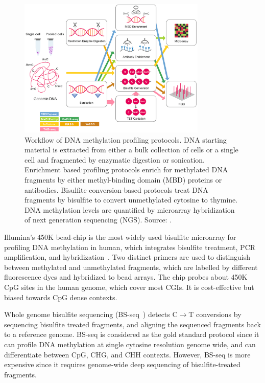 \begin{figure}[htbp!]
\centering
\includegraphics[width=0.8\textwidth]{seq}
\caption[Workflow of DNA methylation profiling protocols.]{Workflow of DNA methylation profiling protocols. DNA starting material is extracted from either a bulk collection of cells or a single cell and fragmented by enzymatic digestion or sonication. Enrichment based profiling protocols enrich for methylated DNA fragments by either methyl-binding domain (MBD) proteins or antibodies. Bisulfite conversion-based protocols treat DNA fragments by bisulfite to convert unmethylated cytosine to thymine. DNA methylation levels are quantified by microarray hybridization of next generation sequencing (NGS). Source: \citet{yong_profiling_2016}.}
\label{fig:intro_seq}
\end{figure}

Illumina's 450K bead-chip is the most widely used bisulfite microarray for profiling DNA methylation in human, which integrates bisulfite treatment, PCR amplification, and hybridization~\citep{bibikova_high_2011-1}. Two distinct primers are used to distinguish between methylated and unmethylated fragments, which are labelled by different fluorescence dyes and hybridized to bead arrays.  The chip probes about 450K CpG sites in the human genome, which cover most CGIs. It is cost-effective but biased towards CpG dense contexts.

Whole genome bisulfite sequencing (BS-seq~\citep{urich_methylc-seq_2015}) detects C$\rightarrow$T conversions by sequencing bisulfite treated fragments, and aligning the sequenced fragments back to a reference genome. BS-seq is considered as the gold standard protocol since it can profile DNA methylation at single cytosine resolution genome wide, and can differentiate between CpG, CHG, and CHH contexts. However, BS-seq is more expensive since it requires genome-wide deep sequencing of bisulfite-treated fragments.

